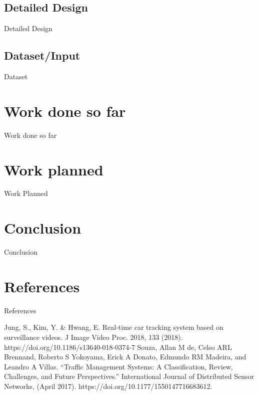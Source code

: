 \documentclass{beamer}
\begin{document}
\subsection{Detailed Design}
\begin{frame}{Detailed Design}
\end{frame}

\subsection{Dataset/Input}
\begin{frame}{Dataset}
\end{frame}


\section{Work done so far}
\begin{frame}{Work done so far}
\end{frame}


\section{Work planned}
\begin{frame}{Work Planned}
\end{frame}


\section{Conclusion}
\begin{frame}{Conclusion}
\end{frame}


\section{References}
\begin{frame}{References}
\begin{thebibliography}{9}
    \bibitem{} Jung, S., Kim, Y. \& Hwang, E. Real-time car tracking system based on surveillance videos. J Image Video Proc. 2018, 133 (2018). https://doi.org/10.1186/s13640-018-0374-7
    \bibitem{} Souza, Allan M de, Celso ARL Brennand, Roberto S Yokoyama, Erick A Donato, Edmundo RM Madeira, and Leandro A Villas. “Traffic Management Systems: A Classification, Review, Challenges, and Future Perspectives.” International Journal of Distributed Sensor Networks, (April 2017). https://doi.org/10.1177/1550147716683612.

\end{thebibliography}
\end{frame}

\end{document}
